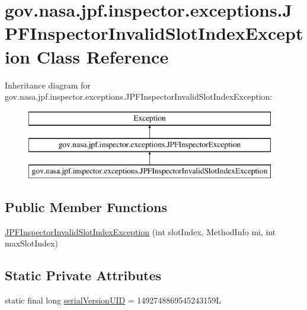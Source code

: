 \hypertarget{classgov_1_1nasa_1_1jpf_1_1inspector_1_1exceptions_1_1_j_p_f_inspector_invalid_slot_index_exception}{}\section{gov.\+nasa.\+jpf.\+inspector.\+exceptions.\+J\+P\+F\+Inspector\+Invalid\+Slot\+Index\+Exception Class Reference}
\label{classgov_1_1nasa_1_1jpf_1_1inspector_1_1exceptions_1_1_j_p_f_inspector_invalid_slot_index_exception}
Inheritance diagram for gov.\+nasa.\+jpf.\+inspector.\+exceptions.\+J\+P\+F\+Inspector\+Invalid\+Slot\+Index\+Exception\+:\begin{figure}[H]
\begin{center}
\leavevmode
\includegraphics[height=3.000000cm]{classgov_1_1nasa_1_1jpf_1_1inspector_1_1exceptions_1_1_j_p_f_inspector_invalid_slot_index_exception}
\end{center}
\end{figure}
\subsection*{Public Member Functions}
\begin{DoxyCompactItemize}
\item 
\hyperlink{classgov_1_1nasa_1_1jpf_1_1inspector_1_1exceptions_1_1_j_p_f_inspector_invalid_slot_index_exception_a7672df0dd0d67905c1b60d796e0047b9}{J\+P\+F\+Inspector\+Invalid\+Slot\+Index\+Exception} (int slot\+Index, Method\+Info mi, int max\+Slot\+Index)
\end{DoxyCompactItemize}
\subsection*{Static Private Attributes}
\begin{DoxyCompactItemize}
\item 
static final long \hyperlink{classgov_1_1nasa_1_1jpf_1_1inspector_1_1exceptions_1_1_j_p_f_inspector_invalid_slot_index_exception_ae91307aa9eed28c640cd670b678696b2}{serial\+Version\+U\+ID} = 1492748869545243159L
\end{DoxyCompactItemize}


